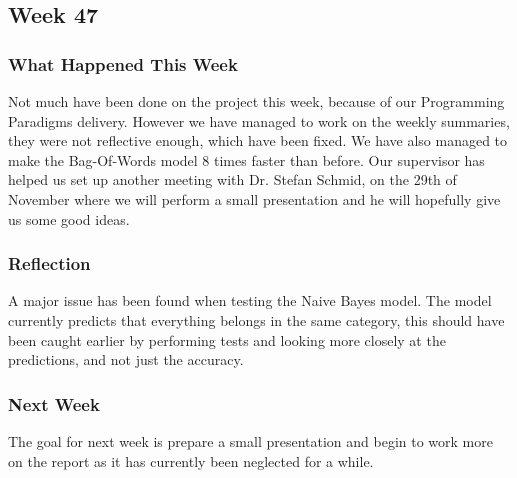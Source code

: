 \subsection{Week 47}
\subsubsection{What Happened This Week}
Not much have been done on the project this week, because of our Programming
Paradigms delivery. However we have managed to work on the weekly summaries,
they were not reflective enough, which have been fixed. We have also managed to
make the Bag-Of-Words model 8 times faster than before. Our supervisor has
helped us set up another meeting with Dr. Stefan Schmid, on the 29th of
November where we will perform a small presentation and he
will hopefully give us some good ideas. 

\subsubsection{Reflection}
A major issue has been found when testing the Naive Bayes model. The model
currently predicts that everything belongs in the same category, this should
have been caught earlier by performing tests and looking more closely at the
predictions, and not just the accuracy.

\subsubsection{Next Week}
The goal for next week is prepare a small presentation and begin to work more on
the report as it has currently been neglected for a while. 


% 
% 
% 
